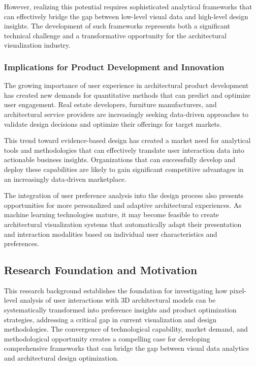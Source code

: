 However, realizing this potential requires sophisticated analytical frameworks that can effectively bridge the gap between low-level visual data and high-level design insights. The development of such frameworks represents both a significant technical challenge and a transformative opportunity for the architectural visualization industry.

\subsubsection{Implications for Product Development and Innovation}
\label{subsubsec:product_development_implications}

The growing importance of user experience in architectural product development has created new demands for quantitative methods that can predict and optimize user engagement. Real estate developers, furniture manufacturers, and architectural service providers are increasingly seeking data-driven approaches to validate design decisions and optimize their offerings for target markets.

This trend toward evidence-based design has created a market need for analytical tools and methodologies that can effectively translate user interaction data into actionable business insights. Organizations that can successfully develop and deploy these capabilities are likely to gain significant competitive advantages in an increasingly data-driven marketplace.

The integration of user preference analysis into the design process also presents opportunities for more personalized and adaptive architectural experiences. As machine learning technologies mature, it may become feasible to create architectural visualization systems that automatically adapt their presentation and interaction modalities based on individual user characteristics and preferences.

\subsection{Research Foundation and Motivation}
\label{subsec:research_foundation}

This research background establishes the foundation for investigating how pixel-level analysis of user interactions with 3D architectural models can be systematically transformed into preference insights and product optimization strategies, addressing a critical gap in current visualization and design methodologies. The convergence of technological capability, market demand, and methodological opportunity creates a compelling case for developing comprehensive frameworks that can bridge the gap between visual data analytics and architectural design optimization.